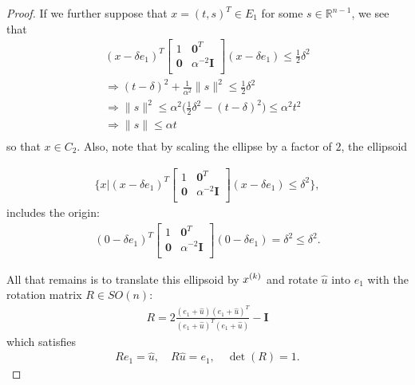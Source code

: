 \begin{proof}
If we further suppose that $x = (t, s)^T \in E_1$ for some $s \in \mathbb R^{n-1}$, we see that
\begin{align*}
(x - \delta e_1)^T\begin{bmatrix}
1 & \boldsymbol0^T \\
\boldsymbol 0 & \alpha^{-2} \boldsymbol I \\
\end{bmatrix}(x - \delta e_1) \le \frac 1 2 \delta^2 \\
\Longrightarrow (t - \delta)^2 + \frac {1} {\alpha^2} \|s\|^2 \le \frac 1 2 \delta^2 \\
\Longrightarrow \|s\|^2 \le \alpha^2 \big(\frac 1 2 \delta^2 - (t - \delta)^2\big) \le \alpha^2t^2\\
\Longrightarrow \|s\| \le \alpha t\\
\end{align*}
so that $x \in C_2$.
Also, note that by scaling the ellipse by a factor of $2$, the ellipsoid

\begin{align*}
\bigg \{x \bigg | (x - \delta e_1)^T\begin{bmatrix}
1 & \boldsymbol0^T \\
\boldsymbol 0 & \alpha^{-2} \boldsymbol I \\
\end{bmatrix}(x - \delta e_1) \le \delta^2 \bigg\},
\end{align*}
includes the origin:
\begin{align*}
(0 - \delta e_1)^T\begin{bmatrix}
1 & \boldsymbol0^T \\
\boldsymbol 0 & \alpha^{-2} \boldsymbol I \\
\end{bmatrix}(0 - \delta e_1) = \delta^2 \le \delta^2.
\end{align*}

All that remains is to translate this ellipsoid by ${x^{(k)}}$ and rotate $\hat u$ into $e_1$ with the rotation matrix $R \in SO(n)$:
\begin{align*}
R = 2\frac{(e_1 + \hat u)(e_1 + \hat u)^T}{(e_1 + \hat u)^T(e_1 + \hat u)} - \boldsymbol I
\end{align*}
which satisfies
\begin{align*}
Re_1 = \hat u, \quad
R\hat u = e_1, \quad
\det(R) = 1.
\end{align*}



\end{proof}
